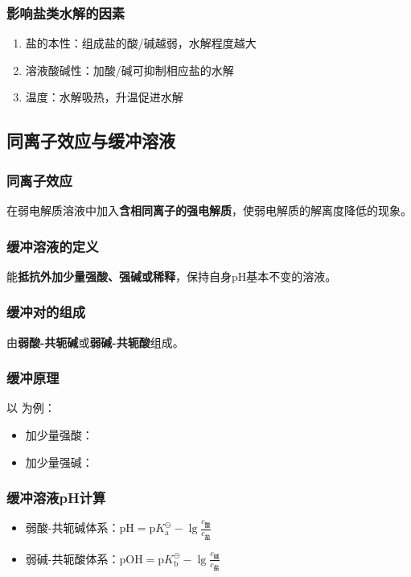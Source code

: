 \subsubsection{影响盐类水解的因素}
\begin{enumerate}
    \item 盐的本性：组成盐的酸/碱越弱，水解程度越大
    \item 溶液酸碱性：加酸/碱可抑制相应盐的水解
    \item 温度：水解吸热，升温促进水解
\end{enumerate}

\subsection{同离子效应与缓冲溶液}
\subsubsection{同离子效应}
在弱电解质溶液中加入\textbf{含相同离子的强电解质}，使弱电解质的解离度降低的现象。

\subsubsection{缓冲溶液的定义}
能\textbf{抵抗外加少量强酸、强碱或稀释}，保持自身pH基本不变的溶液。

\subsubsection{缓冲对的组成}
由\textbf{弱酸-共轭碱}或\textbf{弱碱-共轭酸}组成。

\subsubsection{缓冲原理}
以  为例：
\begin{itemize}
    \item 加少量强酸：
    \item 加少量强碱：
\end{itemize}

\subsubsection{缓冲溶液pH计算}
\begin{itemize}
    \item 弱酸-共轭碱体系：$\text{pH} = \text{p}K_{\text{a}}^{\ominus} - \lg \frac{c_{\text{酸}}}{c_{\text{盐}}}$
    \item 弱碱-共轭酸体系：$\text{pOH} = \text{p}K_{\text{b}}^{\ominus} - \lg \frac{c_{\text{碱}}}{c_{\text{盐}}}$
\end{itemize}


